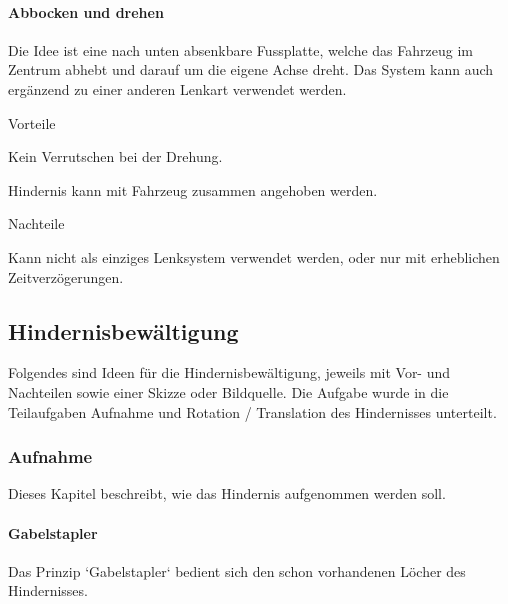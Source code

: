 \documentclass[../main.tex]{subfiles}
\begin{document}
\paragraph{Abbocken und drehen} \label{recherche-abbocken-und-drehen}

Die Idee ist eine nach unten absenkbare Fussplatte, welche das Fahrzeug im Zentrum abhebt und darauf um die eigene Achse dreht. Das System kann auch ergänzend zu einer anderen Lenkart verwendet werden.

\begin{minipage}[t]{0.48\textwidth}
    \begin{items}
      \item [Vorteile]
      \item Kein Verrutschen bei der Drehung.
      \item Hindernis kann mit Fahrzeug zusammen angehoben werden.
 \end{items}
\end{minipage}
\hfill
\begin{minipage}[t]{0.48\textwidth}
    \begin{items}
      \item [Nachteile]
      \item Kann nicht als einziges Lenksystem verwendet werden, oder nur mit erheblichen Zeitverzögerungen.
    \end{items}
\end{minipage}

\newpage
\subsection{Hindernisbewältigung}
\label{a2:Hindernisbewältigung}
Folgendes sind Ideen für die Hindernisbewältigung, jeweils mit Vor- und Nachteilen sowie einer Skizze oder Bildquelle. Die Aufgabe wurde in die Teilaufgaben Aufnahme und Rotation / Translation des Hindernisses unterteilt. 

\subsubsection{Aufnahme}
Dieses Kapitel beschreibt, wie das Hindernis aufgenommen werden soll.
\paragraph{Gabelstapler}
Das Prinzip `Gabelstapler` bedient sich den schon vorhandenen Löcher des Hindernisses.
\end{document}
